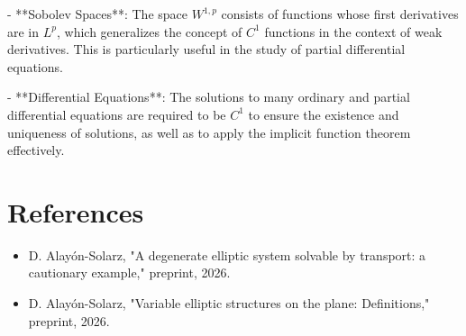 \documentclass[11pt,a4paper]{article}
\begin{document}
- **Sobolev Spaces**: The space \( W^{1,p} \) consists of functions whose first derivatives are in \( L^p \), which generalizes the concept of \( C^1 \) functions in the context of weak derivatives. This is particularly useful in the study of partial differential equations.

- **Differential Equations**: The solutions to many ordinary and partial differential equations are required to be \( C^1 \) to ensure the existence and uniqueness of solutions, as well as to apply the implicit function theorem effectively.

\section{References}
\begin{itemize}
    \item D. Alayón-Solarz, "A degenerate elliptic system solvable by transport: a cautionary example," preprint, 2026. \cite{arxiv:2602.19251}
    \item D. Alayón-Solarz, "Variable elliptic structures on the plane: Definitions," preprint, 2026. \cite{arxiv:2601.19274}
\end{itemize}
\end{document}
